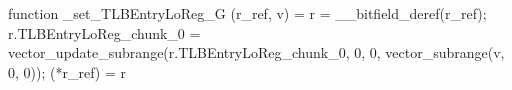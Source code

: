 function _set_TLBEntryLoReg_G (r_ref, v) = {
    r = __bitfield_deref(r_ref);
    r.TLBEntryLoReg_chunk_0 = vector_update_subrange(r.TLBEntryLoReg_chunk_0, 0, 0, vector_subrange(v, 0, 0));
    (*r_ref) = r
}
